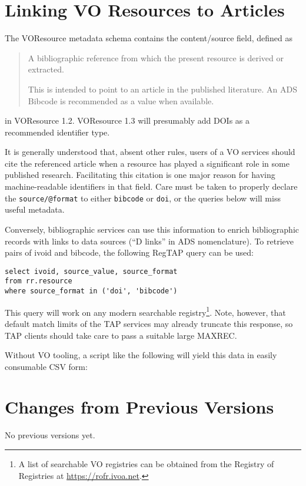 \documentclass[11pt,a4paper]{ivoa}
\begin{document}
\section{Linking VO Resources to Articles}

The VOResource metadata schema \citep{2018ivoa.spec.0625P} contains the
content/source field, defined as

\begin{quotation}
\noindent A bibliographic reference from which the present resource is
derived or extracted.

\noindent This is intended to point to an article in the published
literature. An ADS Bibcode is recommended as a value when available.
\end{quotation}

\noindent in VOResource 1.2.  VOResource 1.3 will presumably add DOIs as a
recommended identifier type.

It is generally understood that, absent other rules, users of a VO
services should cite the referenced article when a resource has played a
significant role in some published research.  Facilitating this citation
is one major reason for having machine-readable identifiers in that
field.  Care must be taken to properly declare the \verb|source/@format|
to either \verb|bibcode| or \verb|doi|, or the queries below will miss
useful metadata.

Conversely, bibliographic services can use this information to enrich
bibliographic records with links to data sources (``D links'' in ADS
nomenclature).  To retrieve pairs of ivoid and bibcode, the following
RegTAP \citep{2019ivoa.spec.1011D} query can be used:

\begin{lstlisting}
select ivoid, source_value, source_format
from rr.resource
where source_format in ('doi', 'bibcode')
\end{lstlisting}

This query will work on any modern searchable registry\footnote{A list
of searchable VO registries can be obtained from the Registry of
Registries at \url{https://rofr.ivoa.net}.}.  Note, however, that
default match limits of the TAP services may already truncate this
response, so TAP clients should take care to pass a suitable large
MAXREC.

Without VO tooling, a script like the following will yield this data in
easily consumable CSV form:



\appendix
\section{Changes from Previous Versions}

No previous versions yet.



\end{document}
